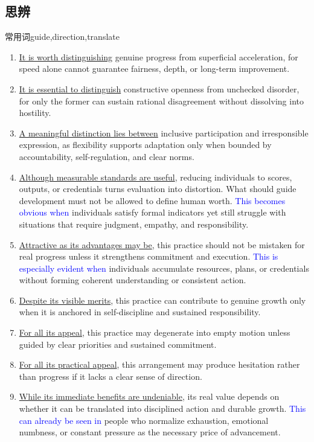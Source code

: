 \subsection{思辨}
常用词guide,direction,translate
\begin{enumerate}
  \item \underline{It is worth distinguishing} genuine progress from superficial acceleration, for speed alone cannot guarantee fairness, depth, or long-term improvement.
  \item \underline{It is essential to distinguish} constructive openness from unchecked disorder, for only the former can sustain rational disagreement without dissolving into hostility.
   \item \underline{A meaningful distinction lies between} inclusive participation and irresponsible expression, as flexibility supports adaptation only when bounded by accountability, self-regulation, and clear norms.
      \item \underline{Although measurable standards are useful}, reducing individuals to scores, outputs, or credentials turns evaluation into distortion. What should guide development must not be allowed to define human worth. \textcolor{blue}{This becomes obvious when} individuals satisfy formal indicators yet still struggle with situations that require judgment, empathy, and responsibility.
    \item \underline{Attractive as its advantages may be}, this practice should not be mistaken for real progress unless it strengthens commitment and execution. \textcolor{blue}{This is especially evident when} individuals accumulate resources, plans, or credentials without forming coherent understanding or consistent action.
  \item \underline{Despite its visible merits}, this practice can contribute to genuine growth only when it is anchored in self-discipline and sustained responsibility.  
   \item \underline{For all its appeal}, this practice may degenerate into empty motion unless guided by clear priorities and sustained commitment.
    \item \underline{For all its practical appeal}, this arrangement may produce hesitation rather than progress if it lacks a clear sense of direction.
    \item \underline{While its immediate benefits are undeniable}, its real value depends on whether it can be translated into disciplined action and durable growth. \textcolor{blue}{This can already be seen in} people who normalize exhaustion, emotional numbness, or constant pressure as the necessary price of advancement.

\end{enumerate}
